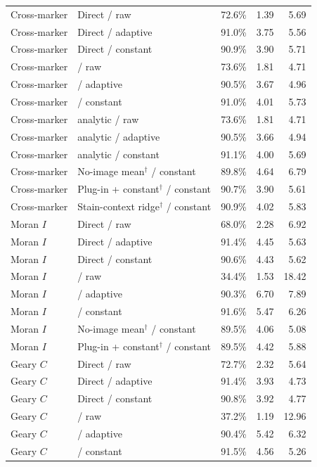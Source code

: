 \begin{longtable}{@{}llrrr@{}}
Cross-marker & Direct / raw & 72.6\% & 1.39 & 5.69 \\
Cross-marker & Direct / adaptive & 91.0\% & 3.75 & 5.56 \\
Cross-marker & Direct / constant & 90.9\% & 3.90 & 5.71 \\
Cross-marker & \method{} / raw & 73.6\% & 1.81 & 4.71 \\
Cross-marker & \method{} / adaptive & 90.5\% & 3.67 & 4.96 \\
Cross-marker & \method{} / constant & 91.0\% & 4.01 & 5.73 \\
Cross-marker & \method{} analytic / raw & 73.6\% & 1.81 & 4.71 \\
Cross-marker & \method{} analytic / adaptive & 90.5\% & 3.66 & 4.94 \\
Cross-marker & \method{} analytic / constant & 91.1\% & 4.00 & 5.69 \\
Cross-marker & No-image mean$^\dagger$ / constant & 89.8\% & 4.64 & 6.79 \\
Cross-marker & Plug-in + constant$^\dagger$ / constant & 90.7\% & 3.90 & 5.61 \\
Cross-marker & Stain-context ridge$^\dagger$ / constant & 90.9\% & 4.02 & 5.83 \\
Moran $I$ & Direct / raw & 68.0\% & 2.28 & 6.92 \\
Moran $I$ & Direct / adaptive & 91.4\% & 4.45 & 5.63 \\
Moran $I$ & Direct / constant & 90.6\% & 4.43 & 5.62 \\
Moran $I$ & \method{} / raw & 34.4\% & 1.53 & 18.42 \\
Moran $I$ & \method{} / adaptive & 90.3\% & 6.70 & 7.89 \\
Moran $I$ & \method{} / constant & 91.6\% & 5.47 & 6.26 \\
Moran $I$ & No-image mean$^\dagger$ / constant & 89.5\% & 4.06 & 5.08 \\
Moran $I$ & Plug-in + constant$^\dagger$ / constant & 89.5\% & 4.42 & 5.88 \\
Geary $C$ & Direct / raw & 72.7\% & 2.32 & 5.64 \\
Geary $C$ & Direct / adaptive & 91.4\% & 3.93 & 4.73 \\
Geary $C$ & Direct / constant & 90.8\% & 3.92 & 4.77 \\
Geary $C$ & \method{} / raw & 37.2\% & 1.19 & 12.96 \\
Geary $C$ & \method{} / adaptive & 90.4\% & 5.42 & 6.32 \\
Geary $C$ & \method{} / constant & 91.5\% & 4.56 & 5.26 \\

\end{longtable}
